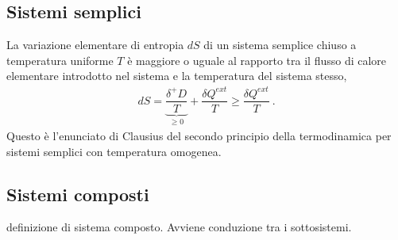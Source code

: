 \documentclass[letterpaper,10pt,italian]{jupyterBook}
\begin{document}
\subsection{Sistemi semplici}
\label{\detokenize{ch/thermodynamics/principles-second:sistemi-semplici}}\label{\detokenize{ch/thermodynamics/principles-second:physics-hs-thermodynamics-foundation-principles-second-simple}}
\sphinxAtStartPar
La variazione elementare di entropia \(d S\) di un sistema semplice chiuso a temperatura uniforme \(T\) è maggiore o uguale al rapporto tra il flusso di calore elementare introdotto nel sistema e la temperatura del sistema stesso,
\begin{equation*}
\begin{split}dS = \underbrace{\dfrac{\delta^+ D}{T}}_{\ge 0} + \dfrac{\delta Q^{ext}}{T} \ge \dfrac{\delta Q^{ext}}{T} \ .\end{split}
\end{equation*}
\sphinxAtStartPar
Questo è l’enunciato di Clausius del secondo principio della termodinamica per sistemi semplici con temperatura omogenea.


\subsection{Sistemi composti}
\label{\detokenize{ch/thermodynamics/principles-second:sistemi-composti}}\label{\detokenize{ch/thermodynamics/principles-second:physics-hs-thermodynamics-principles-second-composite}}
\sphinxAtStartPar
{} definizione di sistema composto. Avviene conduzione tra i sotto\sphinxhyphen{}sistemi.
\end{document}
